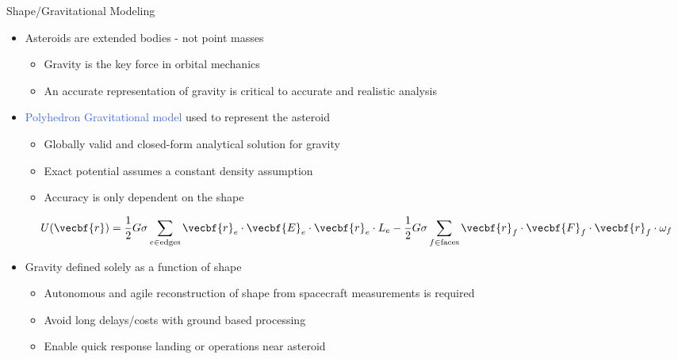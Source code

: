 \documentclass[final, usenames, dvipsnames]{beamer}
\newlength{\onecolwidth}
\def\Emph{\textcolor{RoyalBlue}}
\begin{document}
\begin{frame}[t]
\begin{columns}[T,onlytextwidth]
\begin{column}{\onecolwidth}
        \begin{block}{Shape/Gravitational Modeling}
            \begin{itemize}
                \item Asteroids are extended bodies - not point masses
                    \begin{itemize}
                        \item Gravity is the key force in orbital mechanics
                        \item An accurate representation of gravity is critical to accurate and realistic analysis
                    \end{itemize}
                \item \Emph{Polyhedron Gravitational model} used to represent the asteroid
                    \begin{itemize}
                        \item Globally valid and closed-form analytical solution for gravity
                        \item Exact potential assumes a constant density assumption
                        \item Accuracy is only dependent on the shape
                    \end{itemize}
                    \[
                        U(\vecbf{r}) = \frac{1}{2} G \sigma \sum_{e \in
                        \text{edges}} \vecbf{r}_e \cdot \vecbf{E}_e \cdot
                        \vecbf{r}_e \cdot L_e - \frac{1}{2}G \sigma \sum_{f \in
                        \text{faces}} \vecbf{r}_f \cdot \vecbf{F}_f \cdot
                        \vecbf{r}_f \cdot \omega_f 
                    \]	
                \item Gravity defined solely as a function of shape
                    \begin{itemize}
                        \item Autonomous and agile reconstruction of shape from spacecraft measurements is required
                        \item Avoid long delays/costs with ground based processing
                        \item Enable quick response landing or operations near asteroid 
                    \end{itemize}
            \end{itemize}
        \end{block} 

\end{column}  %


\end{columns}
\end{frame}
\end{document}
